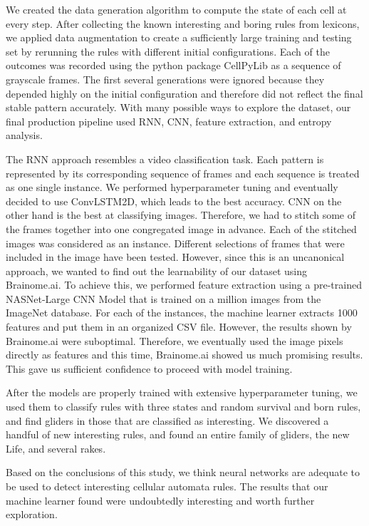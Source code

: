 \documentclass[12pt]{article}
\numberwithin{figure}{section} %
\begin{document}
We created the data generation algorithm to compute the state of each cell at every step. After collecting the known interesting and boring rules from lexicons, we applied data augmentation to create a sufficiently large training and testing set by rerunning the rules with different initial configurations. Each of the outcomes was recorded using the python package CellPyLib as a sequence of grayscale frames. The first several generations were ignored because they depended highly on the initial configuration and therefore did not reflect the final stable pattern accurately. With many possible ways to explore the dataset, our final production pipeline used RNN, CNN, feature extraction, and entropy analysis. 

The RNN approach resembles a video classification task. Each pattern is represented by its corresponding sequence of frames and each sequence is treated as one single instance. We performed hyperparameter tuning and eventually decided to use ConvLSTM2D, which leads to the best accuracy. CNN on the other hand is the best at classifying images. Therefore, we had to stitch some of the frames together into one congregated image in advance. Each of the stitched images was considered as an instance. Different selections of frames that were included in the image have been tested. However, since this is an uncanonical approach, we wanted to find out the learnability of our dataset using Brainome.ai. To achieve this, we performed feature extraction using a pre-trained NASNet-Large CNN Model that is trained on a million images from the ImageNet database. For each of the instances, the machine learner extracts 1000 features and put them in an organized CSV file. However, the results shown by Brainome.ai were suboptimal. Therefore, we eventually used the image pixels directly as features and this time, Brainome.ai showed us much promising results. This gave us sufficient confidence to proceed with model training. 

After the models are properly trained with extensive hyperparameter tuning, we used them to classify rules with three states and random survival and born rules, and find gliders in those that are classified as interesting. We discovered a handful of new interesting rules, and found an entire family of gliders, the new Life, and several rakes. 

Based on the conclusions of this study, we think neural networks are adequate to be used to detect interesting cellular automata rules. The results that our machine learner found were undoubtedly interesting and worth further exploration. 
\end{document}

